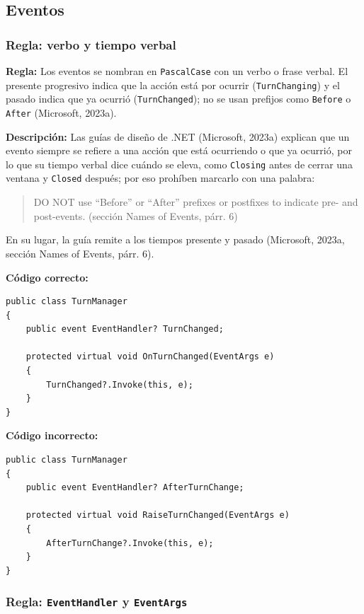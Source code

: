 \subsection{Eventos}

\subsubsection{Regla: verbo y tiempo verbal}

\textbf{Regla:} Los eventos se nombran en \texttt{PascalCase} con un verbo o frase verbal. El presente progresivo indica que la acción está por ocurrir (\texttt{TurnChanging}) y el pasado indica que ya ocurrió (\texttt{TurnChanged}); no se usan prefijos como \texttt{Before} o \texttt{After} (Microsoft, 2023a).

\textbf{Descripción:} Las guías de diseño de .NET (Microsoft, 2023a) explican que un evento siempre se refiere a una acción que está ocurriendo o que ya ocurrió, por lo que su tiempo verbal dice cuándo se eleva, como \texttt{Closing} antes de cerrar una ventana y \texttt{Closed} después; por eso prohíben marcarlo con una palabra:
\begin{quote}
DO NOT use ``Before'' or ``After'' prefixes or postfixes to indicate pre- and post-events. (sección Names of Events, párr. 6)
\end{quote}
\noindent En su lugar, la guía remite a los tiempos presente y pasado (Microsoft, 2023a, sección Names of Events, párr. 6).

\textbf{Código correcto:}
\begin{lstlisting}[style=csharpstyle]
public class TurnManager
{
    public event EventHandler? TurnChanged;

    protected virtual void OnTurnChanged(EventArgs e)
    {
        TurnChanged?.Invoke(this, e);
    }
}
\end{lstlisting}

\textbf{Código incorrecto:}
\begin{lstlisting}[style=csharpstyle]
public class TurnManager
{
    public event EventHandler? AfterTurnChange;

    protected virtual void RaiseTurnChanged(EventArgs e)
    {
        AfterTurnChange?.Invoke(this, e);
    }
}
\end{lstlisting}

\subsubsection{Regla: \texttt{EventHandler} y \texttt{EventArgs}}


